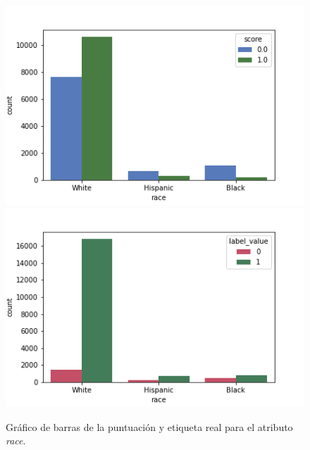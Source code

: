 \begin{figure}[h]
      \includegraphics[width=\linewidth]{images/score_race_law.png}
    \endminipage\hfill
      \includegraphics[width=\linewidth]{images/label_race_law.png}
    \endminipage
     \caption{Gráfico de barras de la puntuación y etiqueta real para el atributo \textit{race}.}
     \label{fig:barrasracelaw}
\end{figure}


